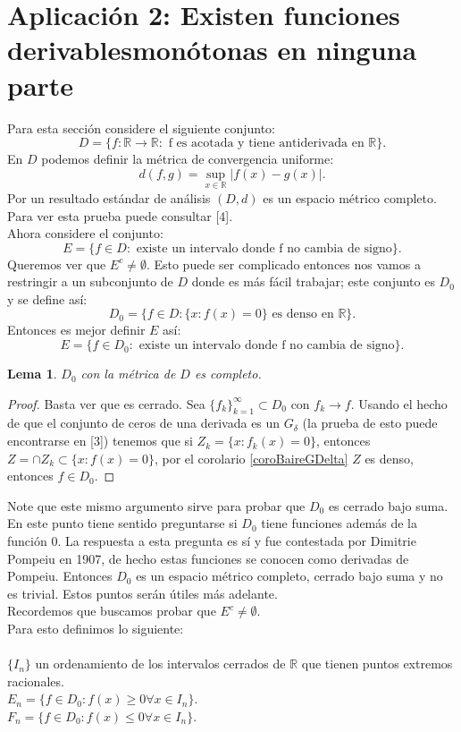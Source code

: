\documentclass{article}
\newtheorem{lemma}[theorem]{Lema}
\theoremstyle{definition}
\newcommand{\suc}[4][\infty]{\{{#2_#3}\}_{#3=#4}^#1}
\newcommand{\R}{\mathbb{R}}
\begin{document}
\section{Aplicación 2: Existen funciones derivables\newline monótonas en ninguna parte}\label{ap2}
Para esta sección considere el siguiente conjunto:
$$
D=\{f:\R \rightarrow \R: \text{ f es acotada y tiene antiderivada en } \R \}.
$$
En $D$ podemos definir la métrica de convergencia uniforme:
$$
d(f,g)=\sup_{x\in \R} |f(x)-g(x)|.
$$
Por un resultado estándar de análisis $(D,d)$ es un espacio métrico completo. Para ver esta prueba puede consultar [4]. \\
Ahora considere el conjunto:
$$
E=\{f \in D:\text{ existe un intervalo donde f no cambia de signo}\}.
$$
Queremos ver que $E^c\neq \emptyset$. Esto puede ser complicado entonces nos vamos a restringir a un subconjunto de $D$ donde es más fácil trabajar; este conjunto es $D_0$ y se define así:\\
$$
D_0=\{f \in D: \{x: f(x)=0\} \text{ es denso en } \R \}.
$$
Entonces es mejor definir $E$ así:
$$
E=\{f \in D_0:\text{ existe un intervalo donde f no cambia de signo}\}.
$$

\begin{lemma}
$D_0$ con la métrica de $D$ es completo. 
\end{lemma}
\begin{proof}
Basta ver que es cerrado. Sea $\suc{f}{k}{1}\subset D_0$ con $f_k\rightarrow f$. Usando el hecho de que el conjunto de ceros de una derivada es un $G_\delta$ (la prueba de esto puede encontrarse en [3]) tenemos que si $Z_k=\{x:f_k(x)=0\}$, entonces $Z=\cap Z_k \subset \{x:f(x)=0\}$, por el corolario \ref{coroBaireGDelta} $Z$ es denso, entonces $f\in D_0$.
\end{proof}
Note que este mismo argumento sirve para probar que $D_0$ es cerrado bajo suma. En este punto tiene sentido preguntarse si $D_0$ tiene funciones además de la función $0$. La respuesta a esta pregunta es sí y fue contestada por Dimitrie Pompeiu en 1907, de hecho estas funciones se conocen como derivadas de Pompeiu. Entonces $D_0$ es un espacio métrico completo, cerrado bajo suma y no es trivial. Estos puntos serán útiles más adelante.\\
Recordemos que buscamos probar que $E^c\neq\emptyset$.\\
Para esto definimos lo siguiente:\\ \\
$\{I_n\}$ un ordenamiento de los intervalos cerrados de $\R$ que tienen puntos extremos racionales.\\
$E_n=\{f\in D_0: f(x)\geq0 \forall x\in I_n \}$.\\
$F_n=\{f\in D_0: f(x)\leq0 \forall x\in I_n \}$.
\end{document}
